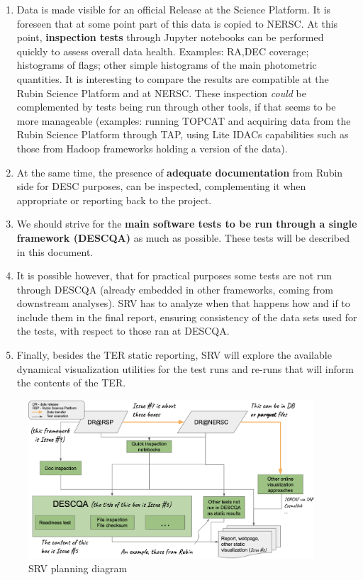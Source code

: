 \documentclass[12pt, a4paper]{article}
\begin{document}
\begin{enumerate}
	\item Data is made visible for an official Release at the Science Platform. It is foreseen that at some point part of this data is copied to NERSC. At this point, \textbf{inspection tests} through Jupyter notebooks can be performed quickly to assess overall data health. Examples: RA,DEC coverage; histograms of flags; other simple histograms of the main photometric quantities. It is interesting to compare the results are compatible at the Rubin Science Platform and at NERSC. These inspection \textit{could} be complemented by tests being run through other tools, if that seems to be more manageable (examples: running TOPCAT and acquiring data from the Rubin Science Platform through TAP, using Lite IDACs capabilities such as those from Hadoop frameworks holding a version of the data).
	\item At the same time, the presence of \textbf{adequate documentation} from Rubin side for DESC purposes, can be inspected, complementing it when appropriate or reporting back to the project.
	\item We should strive for the \textbf{main software tests to be run through a single framework (DESCQA)} as much as possible. These tests will be described in this document.
	\item It is possible however, that for practical purposes some tests are not run through DESCQA (already embedded in other frameworks, coming from downstream analyses). SRV has to analyze when that happens how and if to include them in the final report, ensuring consistency of the data sets used for the tests, with respect to those ran at DESCQA.
	\item Finally, besides the TER static reporting, SRV will explore the available dynamical visualization utilities for the test runs and re-runs that will inform the contents of the TER.
\end{enumerate}

\begin{figure}[h]
\begin{center}
\includegraphics[width=0.95\textwidth]{../SRV_planning_diagram.png} 
\caption{SRV planning diagram}
\label{fig:srvplanning}
\end{center}
\end{figure}
\end{document}
